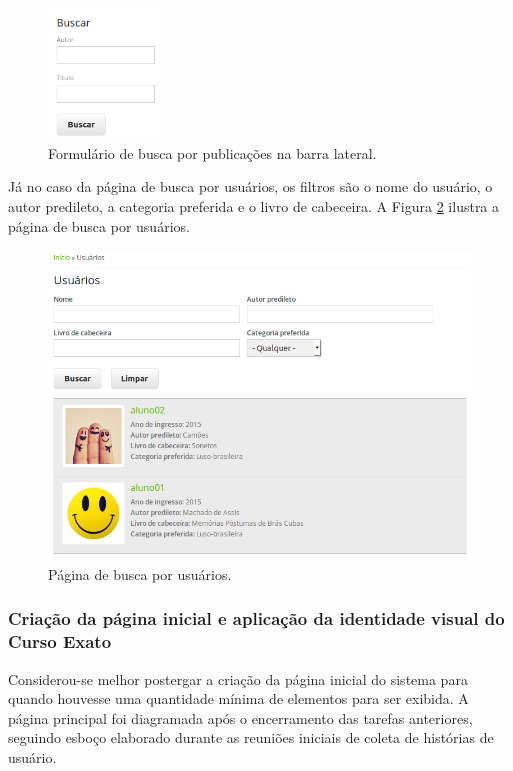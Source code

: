 \documentclass[a4paper]{article}
\begin{document}
\begin{figure}[pbth!]
\centering
\includegraphics[width=30mm]{img/browse-sidebar.png}
\caption{Formulário de busca por publicações na barra lateral.\label{browse-sidebar}}
\end{figure}

Já no caso da página de busca por usuários, os filtros são o nome do usuário, o autor predileto, a categoria preferida e o livro de cabeceira. A Figura \ref{users} ilustra a página de busca por usuários.

\begin{figure}[pbth!]
\centering
\includegraphics[width=120mm]{img/users.png}
\caption{Página de busca por usuários.\label{users}}
\end{figure}


\subsubsection{Criação da página inicial e aplicação da identidade visual do Curso Exato}

Considerou-se melhor postergar a criação da página inicial do sistema para quando houvesse uma quantidade mínima de elementos para ser exibida. A página principal foi diagramada após o encerramento das tarefas anteriores, seguindo esboço elaborado durante as reuniões iniciais de coleta de histórias de usuário.
\end{document}
